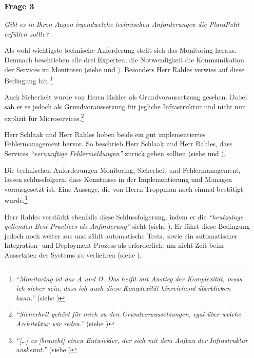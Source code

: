 \subsubsection{Frage 3}

\textit{Gibt es in Ihren Augen irgendwelche technischen Anforderungen die PluraPolit erfüllen sollte?}

Als wohl wichtigste technische Anforderung stellt sich das Monitoring heraus. Demnach beschrieben alle drei Experten, die Notwendigkeit die Kommunikation der Services zu Monitoren (siehe  und ). Besonders Herr Rahles verwies auf diese Bedingung hin.\footnote{
\textit{\enquote{Monitoring ist das A und O. Das heißt mit Anstieg der Komplexität, muss ich sicher sein, dass ich auch diese Komplexität hinreichend überblicken kann.}} (siehe )
}

Auch Sicherheit wurde von Herrn Rahles als Grundvoraussetzung gesehen. Dabei sah er es jedoch als Grundvoraussetzung für jegliche Infrastruktur und nicht nur explizit für Microservices.\footnote{
\textit{\enquote{Sicherheit gehört für mich zu den Grundvoraussetzungen, egal über welche Architektur wir reden.}} (siehe )
}

Herr Schlaak und Herr Rahles hoben beide ein gut implementiertes Fehlermanagement hervor. So beschrieb Herr Schlaak und Herr Rahles, dass Services \textit{\enquote{vernünftige Fehlermeldungen}} zurück geben sollten (siehe  und ).


Die technischen Anforderungen Monitoring, Sicherheit und Fehlermanagement, lassen schlussfolgern, dass Kenntnisse in der Implementierung und Managen vorausgesetzt ist. Eine Aussage, die von Herrn Troppman noch einmal bestätigt wurde.\footnote{
\textit{\enquote{[…] es [braucht] einen Entwickler, der sich mit dem Aufbau der Infrastruktur auskennt.}} (siehe )
}

Herr Rahles verstärkt ebenfalls diese Schlussfolgerung, indem er die \textit{\enquote{heutzutage geltenden Best Practices als Anforderung}} sieht (siehe ). Er führt diese Bedingung jedoch noch weiter aus und zählt automatische Tests, sowie ein automatischer Integration- und Deployment-Prozess als erforderlich, um nicht Zeit beim Aussetzten des Systems zu verliehren (siehe ).

